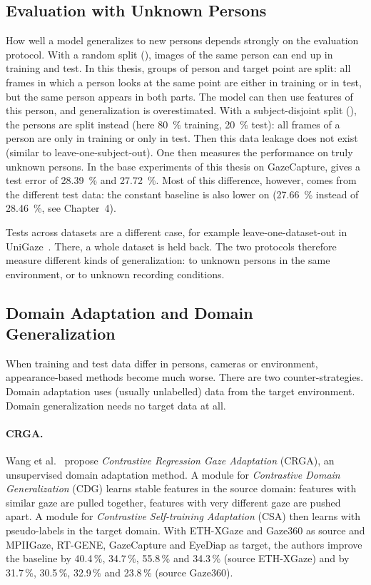 \subsection{Evaluation with Unknown Persons}
\label{subsec:norm_subject}
How well a model generalizes to new persons depends strongly on the evaluation
protocol. With a random split (), images of the same person
can end up in training and test. In this thesis, groups of person and target
point are split: all frames in which a person looks at the same point are
either in training or in test, but the same person appears in both parts. The model can then use
features of this person, and generalization is overestimated. With a
subject-disjoint split (), the persons are split instead
(here \SI{80}{\percent} training, \SI{20}{\percent} test): all frames of a
person are only in training or only in test. Then this data leakage does not
exist (similar to leave-one-subject-out). One then measures the performance on truly
unknown persons. In the base experiments of this thesis on GazeCapture,
 gives a test error of \SI{28.39}{\percent} and
 \SI{27.72}{\percent}. Most of this difference, however,
comes from the different test data: the constant baseline is also lower on
 (\SI{27.66}{\percent} instead of \SI{28.46}{\percent}, see
Chapter~4).

Tests across datasets are a different case, for example leave-one-dataset-out
in UniGaze~\cite{qin2026unigaze}. There, a whole dataset is held back. The two
protocols therefore measure different kinds of generalization: to unknown
persons in the same environment, or to unknown recording conditions.

\subsection{Domain Adaptation and Domain Generalization}
\label{subsec:domain_adaptation}
When training and test data differ in persons, cameras or environment,
appearance-based methods become much worse. There are two counter-strategies.
Domain adaptation uses (usually unlabelled) data from the target environment.
Domain generalization needs no target data at all.

\paragraph{CRGA.}
Wang et al.~\cite{wang2022crga} propose \emph{Contrastive Regression Gaze
Adaptation} (CRGA), an unsupervised domain adaptation method. A module for
\emph{Contrastive Domain Generalization} (CDG) learns stable features in the
source domain: features with similar gaze are pulled together, features with
very different gaze are pushed apart. A module for \emph{Contrastive
Self-training Adaptation} (CSA) then learns with pseudo-labels in the target
domain. With ETH-XGaze and Gaze360 as source and MPIIGaze, RT-GENE, GazeCapture
and EyeDiap as target, the authors improve the baseline by 40.4\,\%, 34.7\,\%,
55.8\,\% and 34.3\,\% (source ETH-XGaze) and by 31.7\,\%, 30.5\,\%, 32.9\,\%
and 23.8\,\% (source Gaze360).

